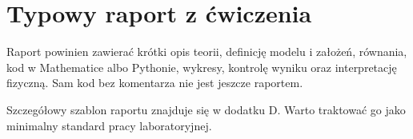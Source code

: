 \section{Typowy raport z ćwiczenia}

Raport powinien zawierać krótki opis teorii, definicję modelu i założeń,
równania, kod w Mathematice albo Pythonie, wykresy, kontrolę wyniku oraz
interpretację fizyczną. Sam kod bez komentarza nie jest jeszcze raportem.

Szczegółowy szablon raportu znajduje się w dodatku D. Warto traktować go jako
minimalny standard pracy laboratoryjnej.
